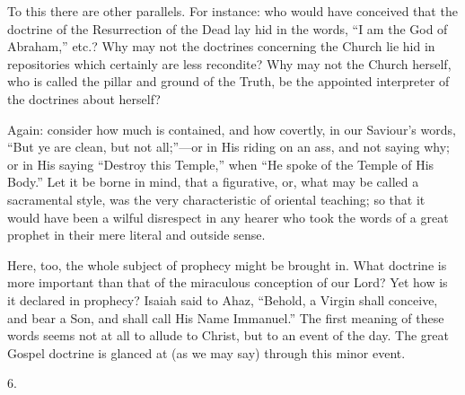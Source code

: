 To this there are other parallels. For instance: who would have
conceived that the doctrine of the Resurrection of the Dead lay hid in
the words, ``I am the God of Abraham,'' etc.? Why may not the
doctrines concerning the Church lie hid in repositories which
certainly are less recondite? Why may not the Church herself, who is
called the pillar and ground of the Truth, be the appointed
interpreter of the doctrines about herself?

Again: consider how much is contained, and how covertly, in our
Saviour's words, ``But ye are clean, but not all;''—or in
His riding on an ass, and not saying why; or in His saying
``Destroy this Temple,'' when ``He spoke of the Temple of
His Body.'' Let it be borne in mind, that a figurative, or,
what may be called a sacramental style, was the very characteristic of
oriental teaching; so that it would have been a wilful disrespect in
any hearer who took the words of a great prophet in their mere literal
and outside sense.

Here, too, the whole subject of prophecy might be brought in. What
doctrine is more important than that of the miraculous conception of
our Lord? Yet how is it declared in prophecy? Isaiah said to Ahaz,
``Behold, a Virgin shall conceive, and bear a Son, and shall call
His Name Immanuel.'' The first meaning of these words seems not at
all to allude to Christ, but to an event of the day. The great Gospel
doctrine is glanced at (as we may say) through this minor event.

6.

